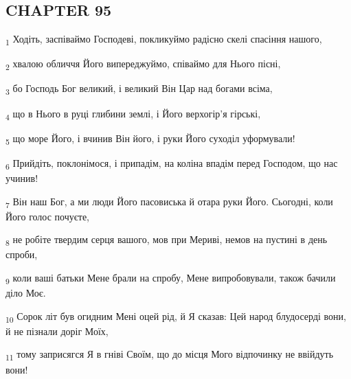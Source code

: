 \subsection{CHAPTER 95}
\begin{tcolorbox}
\textsubscript{1} Ходіть, заспіваймо Господеві, покликуймо радісно скелі спасіння нашого,
\end{tcolorbox}
\begin{tcolorbox}
\textsubscript{2} хвалою обличчя Його випереджуймо, співаймо для Нього пісні,
\end{tcolorbox}
\begin{tcolorbox}
\textsubscript{3} бо Господь Бог великий, і великий Він Цар над богами всіма,
\end{tcolorbox}
\begin{tcolorbox}
\textsubscript{4} що в Нього в руці глибини землі, і Його верхогір'я гірські,
\end{tcolorbox}
\begin{tcolorbox}
\textsubscript{5} що море Його, і вчинив Він його, і руки Його суходіл уформували!
\end{tcolorbox}
\begin{tcolorbox}
\textsubscript{6} Прийдіть, поклонімося, і припадім, на коліна впадім перед Господом, що нас учинив!
\end{tcolorbox}
\begin{tcolorbox}
\textsubscript{7} Він наш Бог, а ми люди Його пасовиська й отара руки Його. Сьогодні, коли Його голос почуєте,
\end{tcolorbox}
\begin{tcolorbox}
\textsubscript{8} не робіте твердим серця вашого, мов при Мериві, немов на пустині в день спроби,
\end{tcolorbox}
\begin{tcolorbox}
\textsubscript{9} коли ваші батьки Мене брали на спробу, Мене випробовували, також бачили діло Моє.
\end{tcolorbox}
\begin{tcolorbox}
\textsubscript{10} Сорок літ був огидним Мені оцей рід, й Я сказав: Цей народ блудосерді вони, й не пізнали доріг Моїх,
\end{tcolorbox}
\begin{tcolorbox}
\textsubscript{11} тому заприсягся Я в гніві Своїм, що до місця Мого відпочинку не ввійдуть вони!
\end{tcolorbox}
